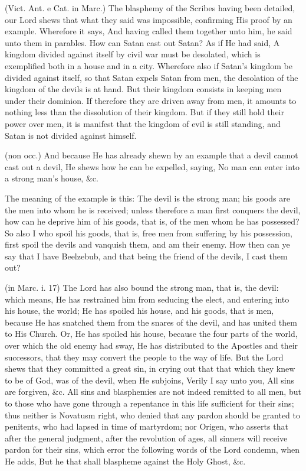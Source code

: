  (Vict. Ant. e Cat. in Marc.) The blasphemy of the Scribes having been detailed, our Lord shews that what they said was impossible, confirming His proof by an example. Wherefore it says, And having called them together unto him, he said unto them in parables. How can Satan cast out Satan? As if He had said, A kingdom divided against itself by civil war must be desolated, which is exemplified both in a house and in a city. Wherefore also if Satan’s kingdom be divided against itself, so that Satan expels Satan from men, the desolation of the kingdom of the devils is at hand. But their kingdom consists in keeping men under their dominion. If therefore they are driven away from men, it amounts to nothing less than the dissolution of their kingdom. But if they still hold their power over men, it is manifest that the kingdom of evil is still standing, and Satan is not divided against himself.

 (non occ.) And because He has already shewn by an example that a devil cannot cast out a devil, He shews how he can be expelled, saying, No man can enter into a strong man’s house, \&c.

 The meaning of the example is this: The devil is the strong man; his goods are the men into whom he is received; unless therefore a man first conquers the devil, how can he deprive him of his goods, that is, of the men whom he has possessed? So also I who spoil his goods, that is, free men from suffering by his possession, first spoil the devils and vanquish them, and am their enemy. How then can ye say that I have Beelzebub, and that being the friend of the devils, I cast them out?

 (in Marc. i. 17) The Lord has also bound the strong man, that is, the devil: which means, He has restrained him from seducing the elect, and entering into his house, the world; He has spoiled his house, and his goods, that is men, because He has snatched them from the snares of the devil, and has united them to His Church. Or, He has spoiled his house, because the four parts of the world, over which the old enemy had sway, He has distributed to the Apostles and their successors, that they may convert the people to the way of life. But the Lord shews that they committed a great sin, in crying out that that which they knew to be of God, was of the devil, when He subjoins, Verily I say unto you, All sins are forgiven, \&c. All sins and blasphemies are not indeed remitted to all men, but to those who have gone through a repentance in this life sufficient for their sins; thus neither is Novatusm right, who denied that any pardon should be granted to penitents, who had lapsed in time of martyrdom; nor Origen, who asserts that after the general judgment, after the revolution of ages, all sinners will receive pardon for their sins, which error the following words of the Lord condemn, when He adds, But he that shall blaspheme against the Holy Ghost, \&c.

